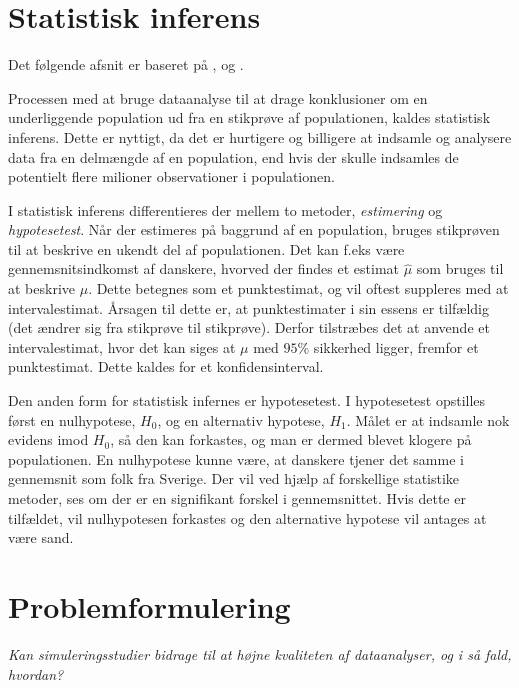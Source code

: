 \documentclass[
]{book}
\theoremstyle{definition}
\theoremstyle{definition}
\theoremstyle{definition}
\theoremstyle{remark}
\begin{document}
\hypertarget{statistisk-inferens}{%
\section{Statistisk inferens}\label{statistisk-inferens}}

Det følgende afsnit er baseret på \citep{ASTAkursus1}, \citep{ASTAkursus2} og \citep{ASTAkursus3}.

Processen med at bruge dataanalyse til at drage konklusioner om en underliggende population ud fra en stikprøve af populationen, kaldes statistisk inferens. Dette er nyttigt, da det er hurtigere og billigere at indsamle og analysere data fra en delmængde af en population, end hvis der skulle indsamles de potentielt flere milioner observationer i populationen.

I statistisk inferens differentieres der mellem to metoder, \emph{estimering} og \emph{hypotesetest}. Når der estimeres på baggrund af en population, bruges stikprøven til at beskrive en ukendt del af populationen. Det kan f.eks være gennemsnitsindkomst af danskere, hvorved der findes et estimat \(\hat{\mu}\) som bruges til at beskrive \(\mu\). Dette betegnes som et punktestimat, og vil oftest suppleres med at intervalestimat. Årsagen til dette er, at punktestimater i sin essens er tilfældig (det ændrer sig fra stikprøve til stikprøve). Derfor tilstræbes det at anvende et intervalestimat, hvor det kan siges at \(\mu\) med \(95\%\) sikkerhed ligger, fremfor et punktestimat. Dette kaldes for et konfidensinterval.

Den anden form for statistisk infernes er hypotesetest. I hypotesetest opstilles først en nulhypotese, \(H_0\), og en alternativ hypotese, \(H_1\). Målet er at indsamle nok evidens imod \(H_0\), så den kan forkastes, og man er dermed blevet klogere på populationen.
En nulhypotese kunne være, at danskere tjener det samme i gennemsnit som folk fra Sverige. Der vil ved hjælp af forskellige statistike metoder, ses om der er en signifikant forskel i gennemsnittet.
Hvis dette er tilfældet, vil nulhypotesen forkastes og den alternative hypotese vil antages at være sand.

\hypertarget{problemformulering}{%
\section{Problemformulering}\label{problemformulering}}

\emph{Kan simuleringsstudier bidrage til at højne kvaliteten af dataanalyser, og i så fald, hvordan?}
\end{document}
